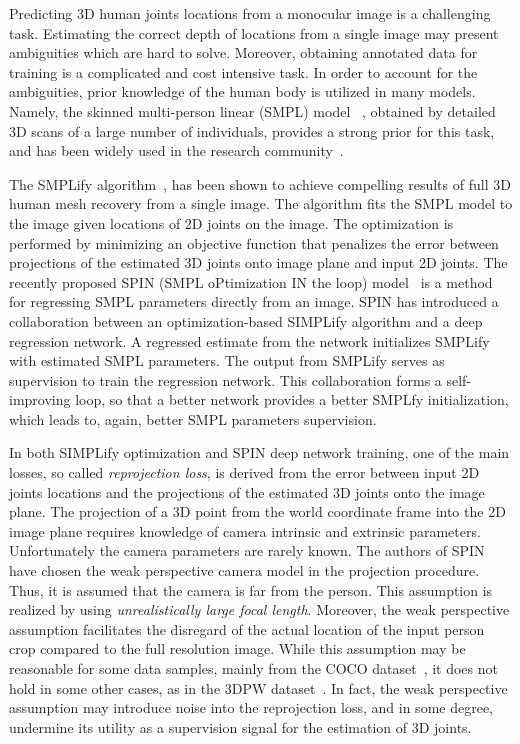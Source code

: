 \documentclass[runningheads]{llncs}
\begin{document}
Predicting 3D human joints locations from a monocular image is a challenging task. Estimating the correct depth of locations from a single image may present ambiguities which are hard to solve. Moreover, obtaining annotated data for training is a complicated and cost intensive task. In order to account for the ambiguities, prior knowledge of the human body is utilized in many models. Namely, the skinned multi-person linear (SMPL) model ~\cite{loper2015smpl}, obtained by detailed 3D scans of a large number of individuals, provides a strong prior for this task, and has been widely used in the research community~\cite{kanazawa2018end,omran2018nbf,pavlakos2018humanshape,tsungNIPS2017_7108,varol18_bodynet}.

The SMPLify algorithm~\cite{bogo2016keep}, has been shown to achieve compelling results of full 3D human mesh recovery from a single image. The algorithm fits the SMPL model to the image given locations of 2D joints on the image. The optimization is performed by minimizing an objective function that penalizes the error between projections of the estimated 3D joints onto image plane and input 2D joints. The recently proposed SPIN (SMPL oPtimization IN the loop) model~\cite{kolotouros2019learning} is a method for regressing SMPL parameters directly from an image.  SPIN has introduced a collaboration between an optimization-based SIMPLify algorithm and a deep regression network. A regressed estimate from the network initializes SMPLify with estimated SMPL parameters. The output from SMPLify serves as supervision to train the regression network. This collaboration forms a self-improving loop, so that a better network provides a better SMPLfy initialization, which leads to, again, better SMPL parameters supervision.

 In both SIMPLify optimization and SPIN deep network training, one of the main losses, so called \emph{reprojection loss}, is derived from the error between input 2D joints locations and the projections of the estimated 3D joints onto the image plane. The projection of a 3D point from the world coordinate frame into the 2D image plane requires knowledge of camera intrinsic and extrinsic parameters.  Unfortunately the camera parameters are rarely known. The authors of  SPIN have chosen the weak perspective camera model in the projection procedure. Thus, it is assumed that the camera is far from the person. This assumption is realized by using \emph{unrealistically large focal length}. Moreover, the weak perspective assumption facilitates the disregard of the actual location of the input person crop compared to the full resolution image. While this assumption may be reasonable for some data samples, mainly from the COCO dataset~\cite{lin2014microsoft}, it does not hold in some other cases, as in the 3DPW dataset~\cite{vonMarcard2018}. In fact, the weak perspective assumption may introduce noise into the reprojection loss, and in some degree, undermine its utility as a supervision signal for the estimation of 3D joints.      
\end{document}
